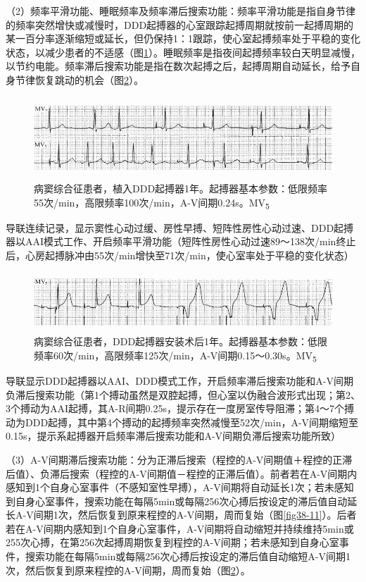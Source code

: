 （2）频率平滑功能、睡眠频率及频率滞后搜索功能：频率平滑功能是指自身节律的频率突然增快或减慢时，DDD起搏器的心室跟踪起搏周期就按前一起搏周期的某一百分率逐渐缩短或延长，但仍保持1：1跟踪，使心室起搏频率处于平稳的变化状态，以减少患者的不适感（图\ref{fig38-30}）。睡眠频率是指夜间起搏频率较白天明显减慢，以节约电能。频率滞后搜索功能是指在数次起搏之后，起搏周期自动延长，给予自身节律恢复跳动的机会（图\ref{fig38-31}）。

\begin{figure}[!htbp]
 \centering
 \includegraphics[width=5.58333in,height=1.20833in]{./images/Image00633.jpg}
 \captionsetup{justification=centering}
 \caption{病窦综合征患者，植入DDD起搏器1年。起搏器基本参数：低限频率55次/min，高限频率100次/min，A-V间期0.24s。MV\textsubscript{5}}
 \label{fig38-30}
  \end{figure} 
导联连续记录，显示窦性心动过缓、房性早搏、短阵性房性心动过速、DDD起搏器以AAI模式工作、开启频率平滑功能（短阵性房性心动过速89～138次/min终止后，心房起搏脉冲由55次/min增快至71次/min，使心室率处于平稳的变化状态）

\begin{figure}[!htbp]
 \centering
 \includegraphics[width=5.58333in,height=0.875in]{./images/Image00634.jpg}
 \captionsetup{justification=centering}
 \caption{病窦综合征患者，DDD起搏器安装术后1年。起搏器基本参数：低限频率60次/min，高限频率125次/min，A-V间期0.15～0.30s。MV\textsubscript{5}}
 \label{fig38-31}
  \end{figure} 
导联显示DDD起搏器以AAI、DDD模式工作，开启频率滞后搜索功能和A-V间期负滞后搜索功能（第1个搏动虽然是双腔起搏，但心室以伪融合波形式出现；第2、3个搏动为AAI起搏，其A-R间期0.25s，提示存在一度房室传导阻滞；第4～7个搏动为DDD起搏，其中第4个搏动的起搏频率突然减慢至52次/min，A-V间期缩短至0.15s，提示系起搏器开启频率滞后搜索功能和A-V间期负滞后搜索功能所致）

（3）A-V间期滞后搜索功能：分为正滞后搜索（程控的A-V间期值＋程控的正滞后值）、负滞后搜索（程控的A-V间期值－程控的正滞后值）。前者若在A-V间期内感知到1个自身心室事件（不感知室性早搏），A-V间期将自动延长1次；若未感知到自身心室事件，搜索功能在每隔5min或每隔256次心搏后按设定的滞后值自动延长A-V间期1次，然后恢复到原来程控的A-V间期，周而复始（图\ref{fig38-11}）。后者若在A-V间期内感知到1个自身心室事件，A-V间期将自动缩短并持续维持5min或255次心搏，在第256次起搏周期恢复到程控的A-V间期；若未感知到自身心室事件，搜索功能在每隔5min或每隔256次心搏后按设定的滞后值自动缩短A-V间期1次，然后恢复到原来程控的A-V间期，周而复始（图\ref{fig38-31}）。

